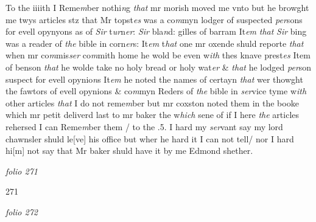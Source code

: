 \documentclass[12pt, a4paper]{book}
\begin{document}
			 To the iiiith I Reme\textit{m}ber nothi\textit{n}g \textit{that} mr morish moved me vnto but he browght me twys articles stz that Mr topst\textit{es} was a co\textit{m}myn lodger of suspected \textit{per}sons for evell opynyons as of \textit{Sir} t\textit{ur}n\textit{er}: \textit{Sir} bla\textit{n}d: gilles of barram It\textit{em}
               \textit{that}
               \textit{Sir} bing was a reader of \textit{the} bible in corn\textit{er}s: It\textit{em} t\textit{hat} one mr oxende shuld reporte \textit{that} when mr co\textit{m}mis\textit{ser} co\textit{m}mith home he wold be even w\textit{ith} thes knave prest\textit{es} Item of benson \textit{that} he wolde take no holy bread or holy wat\textit{er} \& \textit{that} he lodged \textit{per}son suspect for evell opynio\textit{n}s It\textit{em} he noted the names of certayn \textit{that} wer thowght the fawtors of evell opynions \& co\textit{m}myn Reders of \textit{the} bible in \textit{ser}vice tyme w\textit{ith} other articles \textit{that} I do not reme\textit{m}ber but mr coxston noted them in the booke which mr petit deliverd last to mr baker the w\textit{hich}
               sene 
			of if I here \textit{the} articles rehersed I can Reme\textit{m}ber them /  to the .5. I hard my \textit{ser}vant say my lord chawnsler shuld le[ve] his office but wher he hard it I can not tell/ nor I hard hi[m] not say that Mr baker shuld have it   by me Edmond shether.

\dotfill
					

\textit{folio 271}


{\color{Mahogany}271}

\dotfill
					

\textit{folio 272}


         \vspace{4cm}
         
\dotfill
					  \section*{}  \subsection*{}
\end{document}
